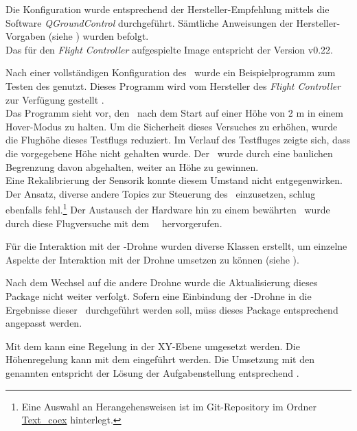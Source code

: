 Die Konfiguration wurde entsprechend der Hersteller-Empfehlung mittels die Software \textit{QGroundControl} durchgeführt. Sämtliche Anweisungen der Hersteller-Vorgaben (siehe \cite{coexConfig}) wurden befolgt.\\
Das für den \textit{Flight Controller} aufgespielte Image entspricht der Version v0.22.


Nach einer vollständigen Konfiguration des \Clover\ wurde ein Beispielprogramm zum Testen des \Quad[s] genutzt. Dieses Programm wird vom Hersteller des \textit{Flight Controller} zur Verfügung gestellt \cite{coexExample}.\\
Das Programm sieht vor, den \Quad\ nach dem Start auf einer Höhe von 2 m in einem Hover-Modus zu halten. Um die Sicherheit dieses Versuches zu erhöhen, wurde die Flughöhe dieses Testflugs reduziert. Im Verlauf des Testfluges zeigte sich, dass die vorgegebene Höhe nicht gehalten wurde. Der \Quad\ wurde durch eine baulichen Begrenzung davon abgehalten, weiter an Höhe zu gewinnen.\\
Eine Rekalibrierung der Sensorik konnte diesem Umstand nicht entgegenwirken. Der Ansatz, diverse andere Topics zur Steuerung des \Clover\ einzusetzen, schlug ebenfalls fehl.\footnote{Eine Auswahl an Herangehensweisen ist im Git-Repository im Ordner \href{https://github.com/MobMonRob/ROSLabDrohne/tree/evolveSignalProcessing/Code/Text\_coex/src}{Text\_coex} hinterlegt.} Der Austausch der Hardware hin zu einem bewährten \Quad\ wurde durch diese Flugversuche mit dem \Quad\ \Clover\ hervorgerufen.


Für die Interaktion mit der \COEX-Drohne wurden diverse Klassen erstellt, um einzelne Aspekte der Interaktion mit der Drohne umsetzen zu können (siehe ).

Nach dem Wechsel auf die andere Drohne wurde die Aktualisierung dieses Package nicht weiter verfolgt. Sofern eine Einbindung der \COEX-Drohne in die Ergebnisse dieser \Arbeit\ durchgeführt werden soll, müss dieses Package entsprechend angepasst werden.


Mit dem  kann eine Regelung in der XY-Ebene umgesetzt werden. Die Höhenregelung kann mit dem  eingeführt werden.
Die Umsetzung mit den genannten \Topic[s] entspricht der Lösung der Aufgabenstellung entsprechend .

